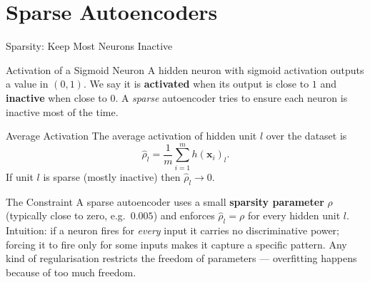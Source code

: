\documentclass{beamer}
\begin{document}
\section{Sparse Autoencoders}

\begin{frame}[shrink=10]{Sparsity: Keep Most Neurons Inactive}
  \begin{block}{Activation of a Sigmoid Neuron}
    A hidden neuron with sigmoid activation outputs a value in $(0,1)$. We
    say it is \textbf{activated} when its output is close to $1$ and
    \textbf{inactive} when close to $0$. A \emph{sparse} autoencoder tries
    to ensure each neuron is inactive most of the time.
  \end{block}

  \begin{block}{Average Activation}
    The average activation of hidden unit $l$ over the dataset is
    \[
      \hat{\rho}_l = \frac{1}{m}\sum_{i=1}^{m} h(\mathbf{x}_i)_l .
    \]
    If unit $l$ is sparse (mostly inactive) then $\hat{\rho}_l \to 0$.
  \end{block}

  \begin{alertblock}{The Constraint}
    A sparse autoencoder uses a small \textbf{sparsity parameter} $\rho$
    (typically close to zero, e.g.\ $0.005$) and enforces
    $\boxed{\hat{\rho}_l = \rho}$ for every hidden unit $l$.
    Intuition: if a neuron fires for \emph{every} input it carries no
    discriminative power; forcing it to fire only for some inputs makes it
    capture a specific pattern. Any kind of regularisation restricts the
    freedom of parameters --- overfitting happens because of too much
    freedom.
  \end{alertblock}
\end{frame}
\end{document}
